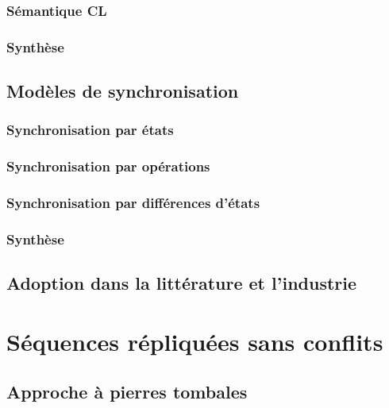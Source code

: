 \documentclass[12pt]{thesul}
\begin{document}
\subsubsection{Sémantique \acl{CL}}


\subsubsection{Synthèse}


\subsection{Modèles de synchronisation}


\subsubsection{Synchronisation par états}


\subsubsection{Synchronisation par opérations}


\subsubsection{Synchronisation par différences d'états}


\subsubsection{Synthèse}


\subsection{Adoption dans la littérature et l'industrie}


\section{Séquences répliquées sans conflits}


\subsection{Approche à pierres tombales}
\end{document}
